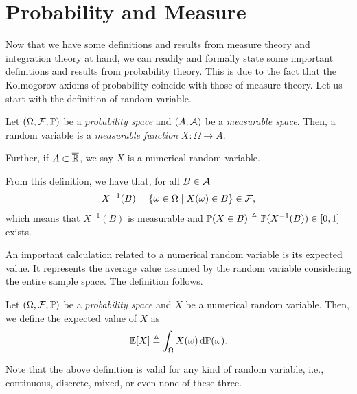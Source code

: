 \section{Probability and Measure}

Now that we have some definitions and results from measure theory and integration theory at hand, we can readily and formally state some important definitions and results from probability theory.
%
This is due to the fact that the Kolmogorov axioms of probability coincide with those of measure theory.
%
Let us start with the definition of random variable.
\begin{definition}
    Let $(\Omega,\cal{F},\P)$ be a \textit{probability space} and $(A,\cal{A})$ be a \textit{measurable space}. Then, a random variable is a \textit{measurable function} $X:\Omega\longrightarrow A$.
    
    Further, if $A \subset \overline{\R}$, we say $X$ is a numerical random variable.
\end{definition}

From this definition, we have that, for all $B\in\cal{A}$
\begin{align*}
    X^{-1}(B) = \{\omega\in\Omega \mid X(\omega)\in B\} \in \cal{F},
\end{align*}
which means that $X^{-1}(B)$ is measurable and $\P(X\in B) \triangleq \P(X^{-1}(B)) \in [0,1]$ exists.

An important calculation related to a numerical random variable is its expected value.
%
It represents the average value assumed by the random variable considering the entire sample space.
%
The definition follows.
%
\begin{definition}
    Let $(\Omega,\cal{F},\P)$ be a \textit{probability space} and $X$ be a numerical random variable. Then, we define the expected value of $X$ as
    \begin{align*}
        \E[X] \triangleq \int_{\Omega} X(\omega)\,\d\P(\omega).
    \end{align*}
\end{definition}
%
Note that the above definition is valid for any kind of random variable, i.e., continuous, discrete, mixed, or even none of these three.

